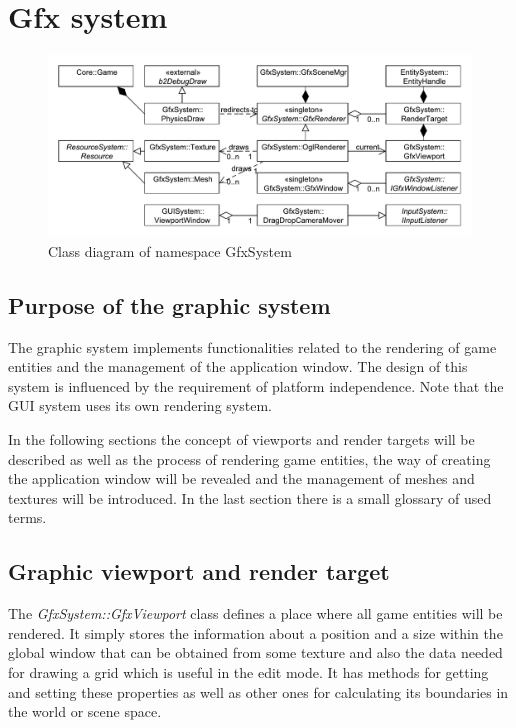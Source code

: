 \documentclass[a4paper, 12pt]{report}
\begin{document}
\chapter{Gfx system}

\begin{figure}[htbp]
	\centering
		\includegraphics[width=1\textwidth]{GfxSystemClassDiagram.pdf}
	\caption{Class diagram of namespace GfxSystem}
	\label{fig:gfxsystem-diagram}
\end{figure}

\section{Purpose of the graphic system}

The graphic system implements functionalities related to the rendering of game entities and the management of the application window. The design of this system is influenced by the requirement of platform independence. Note that the GUI system uses its own rendering system.

In the following sections the concept of viewports and render targets will be described as well as the process of rendering game entities, the way of creating the application window will be revealed and the management of meshes and textures will be introduced. In the last section there is a small glossary of used terms.

\section{Graphic viewport and render target}

The \emph{GfxSystem::GfxViewport} class defines a place where all game entities will be rendered. It simply stores the information about a position and a size within the global window that can be obtained from some texture and also the data needed for drawing a grid which is useful in the edit mode. It has methods for getting and setting these properties as well as other ones for calculating its boundaries in the world or scene space.
\end{document}
